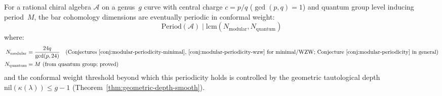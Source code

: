 \begin{conjecture}
\label{conj:complete-periodicity-classification}
For a rational chiral algebra $\mathcal{A}$ on a genus~$g$ curve with
central charge $c = p/q$ ($\gcd(p,q) = 1$) and quantum group level
inducing period~$M$, the bar cohomology dimensions are eventually
periodic in conformal weight:
\[
\text{Period}(\mathcal{A}) \mid
\text{lcm}(N_{\text{modular}}, N_{\text{quantum}})
\]
where:
\begin{align}
N_{\text{modular}} &= \frac{24q}{\gcd(p, 24)} \quad
  \text{(Conjectures~\ref{conj:modular-periodicity-minimal},
  \ref{conj:modular-periodicity-wzw} for minimal/WZW;
  Conjecture~\ref{conj:modular-periodicity} in general)} \\
N_{\text{quantum}} &= M \text{ (from quantum group; proved)}
\end{align}
and the conformal weight threshold beyond which this periodicity
holds is controlled by the geometric tautological depth
$\mathrm{nil}(\kappa(\lambda)) \leq g - 1$
(Theorem~\ref{thm:geometric-depth-smooth}).
\end{conjecture}

